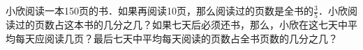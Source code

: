 
小欣阅读一本150页的书．如果再阅读10页，那么阅读过的页数是全书的$\frac{3}{5}$．小欣阅读过的页数占这本书的几分之几？如果七天后必须还书，那么，小欣在这七天中平均每天应阅读几页？最后七天中平均每天阅读的页数占全书页数的几分之几？\\


